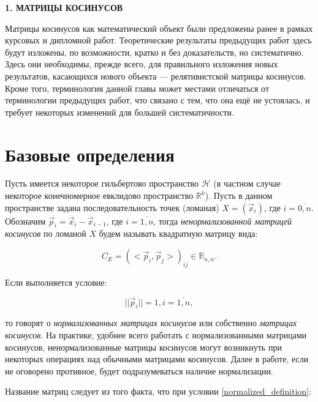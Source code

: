 \newpage
\begin{center}
	\textbf{\large 1. МАТРИЦЫ КОСИНУСОВ}
\end{center}

Матрицы косинусов как математический объект были предложены ранее в рамках курсовых и дипломной работ. Теоретические результаты предыдущих работ здесь будут изложены, по возможности, кратко и без доказательств, но систематично. Здесь они необходимы, прежде всего, для правильного изложения новых результатов, касающихся нового объекта --- релятивистской матрицы косинусов. Кроме того, терминология данной главы может местами отличаться от терминологии предыдущих работ, что связано с тем, что она ещё не устоялась, и требует некоторых изменений для большей систематичности.

\section{Базовые определения}

Пусть имеется некоторое гильбертово пространство $\mathcal{H}$ (в частном случае некоторое конечномерное евклидово пространство $\mathbb{R}^{k}$).
Пусть в данном пространстве задана последовательность точек (ломаная) $X = (\vec{x}_i)$, где $i = \overline{0,n}$. Обозначим $\vec{p}_{i} = \vec{x}_i - \vec{x}_{i-1}$, где $i = \overline{1,n}$, тогда \textit{ненормализованной матрицей косинусов} по ломаной $X$ будем называть квадратную матрицу вида:

\begin{equation}
	{C}_{E} = {(<\vec{p}_{i}, \vec{p}_{j}>)}_{ij} \in \mathbb{R}_{n,n}.
	\label{C_E_definition}
\end{equation}

Если выполняется условие:

\begin{equation}
	||\vec{p}_{i}|| = 1, i = \overline{1,n},
	\label{normalized_definition}
\end{equation}

то говорят о \textit{нормализованных матрицах косинусов} или собственно \textit{матрицах косинусов}. На практике, удобнее всего работать с нормализованными матрицами косинусов, ненормализованные матрицы косинусов могут возникнуть при некоторых операциях над обычными матрицами косинусов. Далее в работе, если не оговорено противное, будет подразумеваться наличие нормализации. 

Название матриц следует из того факта, что при условии \ref{normalized_definition}:

